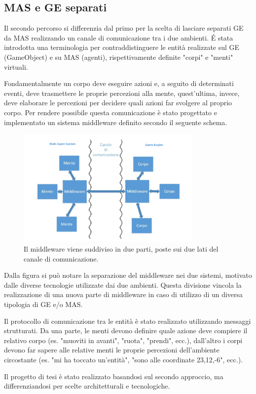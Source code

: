 \subsection{MAS e GE separati} \label{MAS_GE_separati}

Il secondo percorso si differenzia dal primo per la scelta di lasciare separati GE da MAS realizzando un canale di comunicazione tra i due ambienti. \'E stata introdotta una terminologia per contraddistinguere le entità realizzate sul GE (GameObject) e su MAS (agenti), rispettivamente definite "corpi" e "menti" virtuali. \cite{amslaurea12270}

\medskip

Fondamentalmente un corpo deve eseguire azioni e, a seguito di determinati eventi, deve trasmettere le proprie percezioni alla mente, quest'ultima, invece, deve elaborare le percezioni per decidere quali azioni far svolgere al proprio corpo. Per rendere possibile questa comunicazione è stato progettato e implementato un sistema middleware definito secondo il seguente schema.

\begin{figure}[H]
\centering
\includegraphics[width=9cm]{figures/Middleware_fuschini.png}
\caption{Il middleware viene suddiviso in due parti, poste sui due lati del canale di comunicazione. \cite{amslaurea12270}}
\end{figure}

Dalla figura si può notare la separazione del middleware nei due sistemi, motivato dalle diverse tecnologie utilizzate dai due ambienti.
Questa divisione vincola la realizzazione di una nuova parte di middleware in caso di utilizzo di un diversa tipologia di GE e/o MAS.
\medskip

Il protocollo di comunicazione tra le entità è stato realizzato utilizzando messaggi strutturati. Da una parte, le menti devono definire quale azione deve compiere il relativo corpo (es. "muoviti in avanti", "ruota", "prendi", ecc.), dall'altro i corpi devono far sapere alle relative menti le proprie percezioni dell'ambiente circostante (es. "mi ha toccato un'entità", "sono alle coordinate 23,12,-6", ecc.).\cite{amslaurea12270}

\medskip

Il progetto di tesi è stato realizzato basandosi sul secondo approccio, ma differenziandosi per scelte architetturali e tecnologiche.